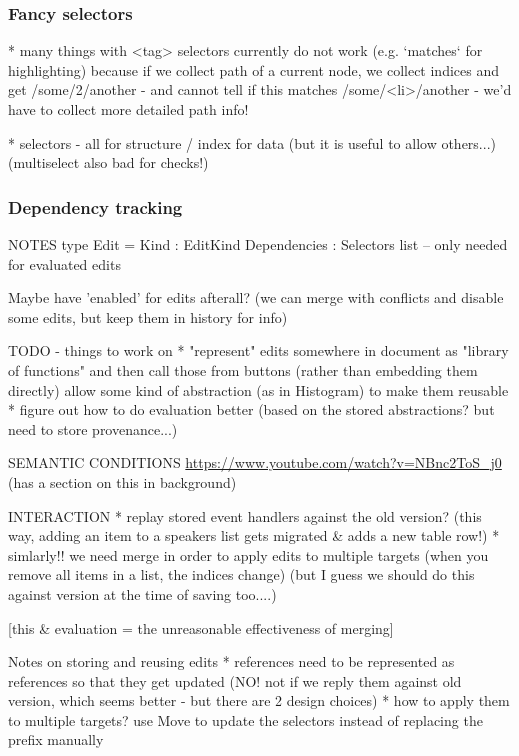 \documentclass[sigconf,anonymous,screen]{acmart}
\begin{document}
\subsubsection*{Fancy selectors}

* many things with <tag> selectors currently do not work
  (e.g. `matches` for highlighting) because if we collect path of a current node,
  we collect indices and get /some/2/another - and cannot tell if this matches
  /some/<li>/another - we'd have to collect more detailed path info!

  * selectors - all for structure / index for data
    (but it is useful to allow others...)
    (multiselect also bad for checks!)

\subsubsection*{Dependency tracking}

NOTES
type Edit =
  { Kind : EditKind
    Dependencies : Selectors list }  -- only needed for evaluated edits




Maybe have 'enabled' for edits afterall?
(we can merge with conflicts and disable some edits, but keep them in history for info)


TODO - things to work on
* "represent" edits somewhere in document as "library of functions"
  and then call those from buttons (rather than embedding them directly)
  allow some kind of abstraction (as in Histogram) to make them reusable
* figure out how to do evaluation better
  (based on the stored abstractions? but need to store provenance...)

SEMANTIC CONDITIONS
\url{https://www.youtube.com/watch?v=NBnc2ToS_j0}
(has a section on this in background)



INTERACTION
* replay stored event handlers against the old version?
  (this way, adding an item to a speakers list gets migrated \& adds a new table row!)
* simlarly!! we need merge in order to apply edits to multiple targets
  (when you remove all items in a list, the indices change)
  (but I guess we should do this against version at the time of saving too....)

[this \& evaluation = the unreasonable effectiveness of merging]

Notes on storing and reusing edits
* references need to be represented as references so that they get updated
  (NO! not if we reply them against old version, which seems better - but there are 2 design choices)
* how to apply them to multiple targets? use Move to update the selectors instead of
  replacing the prefix manually
\end{document}
